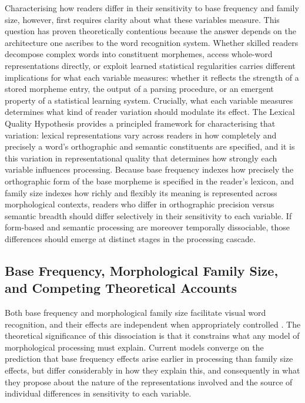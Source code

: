 \documentclass[utf8]{FrontiersinHarvard} %
\begin{document}
	Characterising how readers differ in their sensitivity to base frequency and family size, however, first requires clarity about what these variables measure. This question has proven theoretically contentious because the answer depends on the architecture one ascribes to the word recognition system. Whether skilled readers decompose complex words into constituent morphemes, access whole-word representations directly, or exploit learned statistical regularities carries different implications for what each variable measures: whether it reflects the strength of a stored morpheme entry, the output of a parsing procedure, or an emergent property of a statistical learning system. Crucially, what each variable measures determines what kind of reader variation should modulate its effect. The Lexical Quality Hypothesis \citep{perfettiLexicalQualityHypothesis2002, perfettiReadingAbilityLexical2007, perfettiLexicalQualityRevisited2017} provides a principled framework for characterising that variation: lexical representations vary across readers in how completely and precisely a word's orthographic and semantic constituents are specified, and it is this variation in representational quality that determines how strongly each variable influences processing. Because base frequency indexes how precisely the orthographic form of the base morpheme is specified in the reader's lexicon, and family size indexes how richly and flexibly its meaning is represented across morphological contexts, readers who differ in orthographic precision versus semantic breadth should differ selectively in their sensitivity to each variable. If form-based and semantic processing are moreover temporally dissociable, those differences should emerge at distinct stages in the processing cascade.
	
	
	\subsection{Base Frequency, Morphological Family Size, and Competing Theoretical Accounts}
	
	Both base frequency and morphological family size facilitate visual word recognition, and their effects are independent when appropriately controlled \citep{fordDerivationalMorphologyBase2010}. The theoretical significance of this dissociation is that it constrains what any model of morphological processing must explain. Current models converge on the prediction that base frequency effects arise earlier in processing than family size effects, but differ considerably in how they explain this, and consequently in what they propose about the nature of the representations involved and the source of individual differences in sensitivity to each variable.
	
\end{document}
